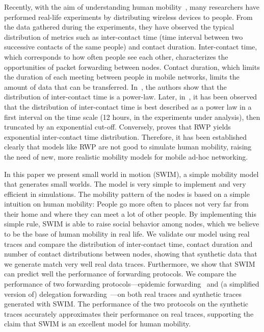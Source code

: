 \documentclass[conference]{IEEEtran}
\begin{document}
Recently, with the aim of understanding human mobility~\cite{toronto, hui05,
hui06, milan07, UCAM-CL-TR-617}, many researchers have performed
real-life experiments by distributing wireless devices to people. From the data
gathered during the experiments, they have observed the typical distribution of
metrics such as inter-contact time (time interval between two successive
contacts of the same people) and contact duration. Inter-contact time, which
corresponds to how often people see each other, characterizes the opportunities
of packet forwarding between nodes. Contact duration, which limits the duration
of each meeting between people in mobile networks, limits the amount of data
that can be transferred.
In~\cite{hui05, hui06}, the authors show that the distribution of
inter-contact time is a power-law. Later, in~\cite{milan07}, it has been
observed that the distribution of inter-contact time is best described as a
power law in a first interval on the time scale (12 hours, in the experiments
under analysis), then truncated by an exponential cut-off. Conversely,
\cite{cai07mobicom} proves that RWP yields exponential inter-contact time
distribution. Therefore, it has been established clearly that models like RWP
are not good to simulate human mobility, raising the need of new, more realistic
mobility models for mobile ad-hoc networking.

In this paper we present small world in motion (SWIM), a simple mobility model that generates small worlds. The model is very simple to implement and very efficient in simulations. The mobility pattern of the nodes is based on a simple intuition on human mobility: People go more often to places not very far from their home and where they can meet a lot of other people. By implementing this simple rule, SWIM is able to raise social behavior among nodes, which we believe to be the base of human mobility in real life.
We validate our model using real traces and compare the distribution of inter-contact time, contact duration and number of contact distributions between nodes, showing that synthetic data that we generate match very well real data traces.
Furthermore, we show that SWIM can predict well the performance of forwarding protocols. We compare the performance of two forwarding protocols---epidemic forwarding~\cite{vahdat00epidemic} and (a simplified version of) delegation forwarding~\cite{dfw08}---on both real traces and synthetic traces generated with SWIM. The performance of the two protocols on the synthetic traces accurately approximates their performance on real traces, supporting the claim that SWIM is an excellent model for human mobility.
\end{document}
